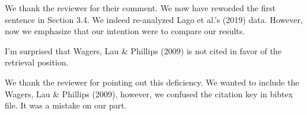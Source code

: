 \documentclass{response}
\begin{document}
\AR We thank the reviewer for their comment. We now have reworded the first sentence in Section 3.4. We indeed re-analyzed Lago et al.'s (2019) data. However, now we emphasize that our intention were to compare our results. 

\RC I'm surprised that Wagers, Lau & Phillips (2009) is not cited in favor of the retrieval position. 

\AR We thank the reviewer for pointing out this deficiency. We wanted to include the Wagers, Lau & Phillips (2009), however, we confused the citation key in bibtex file. It was a mistake on our part. 

\clearpage 



%
\end{document}
